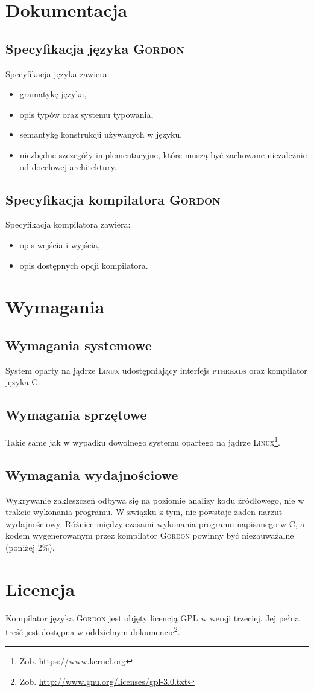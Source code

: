 \documentclass{documentation}
\begin{document}
\section{Dokumentacja}
\subsection{Specyfikacja języka \textsc{Gordon}}
\noindent Specyfikacja języka zawiera:
\begin{itemize}
\item gramatykę języka,
\item opis typów oraz systemu typowania,
\item semantykę konstrukcji używanych w języku,
\item niezbędne szczegóły implementacyjne, które muszą być zachowane niezależnie od docelowej architektury.
\end{itemize}

\subsection{Specyfikacja kompilatora \textsc{Gordon}}
\noindent Specyfikacja kompilatora zawiera:
\begin{itemize}
\item opis wejścia i wyjścia,
\item opis dostępnych opcji kompilatora.
\end{itemize}

\section{Wymagania}
\subsection{Wymagania systemowe}
\noindent System oparty na jądrze \textsc{Linux} udostępniający interfejs \textsc{pthreads} oraz kompilator języka C.

\subsection{Wymagania sprzętowe}
\noindent Takie same jak w wypadku dowolnego systemu opartego na jądrze
\textsc{Linux}\footnote{Zob. \url{https://www.kernel.org}}.

\subsection{Wymagania wydajnościowe}
\noindent Wykrywanie zakleszczeń odbywa się na poziomie analizy kodu źródłowego, nie w trakcie wykonania programu. W związku z tym, nie powstaje żaden narzut wydajnościowy. Różnice między czasami wykonania programu napisanego w C, a kodem wygenerowanym przez kompilator \textsc{Gordon} powinny być niezauważalne (poniżej 2\%).

\section{Licencja}
\noindent Kompilator języka \textsc{Gordon} jest objęty licencją GPL w wersji
trzeciej. Jej pełna treść jest dostępna w oddzielnym
dokumencie\footnote{Zob. \url{http://www.gnu.org/licenses/gpl-3.0.txt}}.
\end{document}

